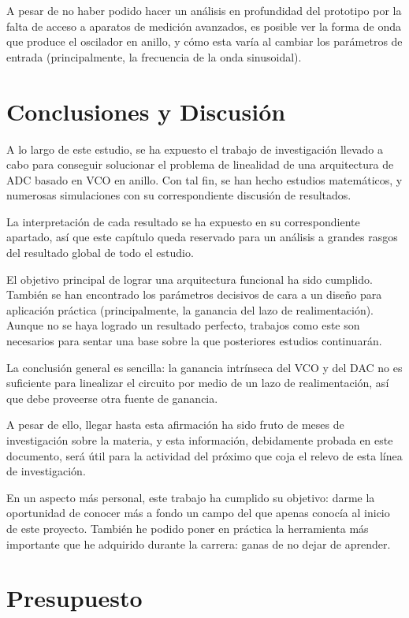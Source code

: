 \documentclass[12pt]{report} %
\begin{document}
	A pesar de no haber podido hacer un análisis en profundidad del prototipo por la falta de acceso a aparatos de medición avanzados, es posible ver la forma de onda que produce el oscilador en anillo, y cómo esta varía al cambiar los parámetros de entrada (principalmente, la frecuencia de la onda sinusoidal).
	
\chapter{Conclusiones y Discusión}

	A lo largo de este estudio, se ha expuesto el trabajo de investigación llevado a cabo para conseguir solucionar el problema de linealidad de una arquitectura de ADC basado en VCO en anillo. Con tal fin, se han hecho estudios matemáticos, y numerosas simulaciones con su correspondiente discusión de resultados.
	
	La interpretación de cada resultado se ha expuesto en su correspondiente apartado, así que este capítulo queda reservado para un análisis a grandes rasgos del resultado global de todo el estudio.
	
	El objetivo principal de lograr una arquitectura funcional ha sido cumplido. También se han encontrado los parámetros decisivos de cara a un diseño para aplicación práctica (principalmente, la ganancia del lazo de realimentación). Aunque no se haya logrado un resultado perfecto, trabajos como este son necesarios para sentar una base sobre la que posteriores estudios continuarán. 
	
	La conclusión general es sencilla: la ganancia intrínseca del VCO y del DAC no es suficiente para linealizar el circuito por medio de un lazo de realimentación, así que debe proveerse otra fuente de ganancia. 
	
	A pesar de ello, llegar hasta esta afirmación ha sido fruto de meses de investigación sobre la materia, y esta información, debidamente probada en este documento, será útil para la actividad del próximo que coja el relevo de esta línea de investigación.
	
	En un aspecto más personal, este trabajo ha cumplido su objetivo: darme la oportunidad de conocer más a fondo un campo del que apenas conocía al inicio de este proyecto. También he podido poner en práctica la herramienta más importante que he adquirido durante la carrera: ganas de no dejar de aprender.
	

\chapter{Presupuesto}
\end{document}
